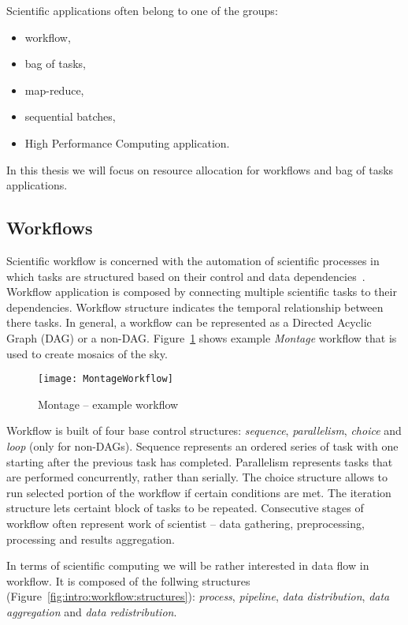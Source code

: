 Scientific applications often belong to one of the groups: 
\begin{itemize}
  \item workflow,
  \item bag of tasks,
  \item map-reduce,  
  \item sequential batches,
  \item High Performance Computing application.
\end{itemize}

In this thesis we will focus on resource allocation for workflows and bag of tasks applications.

\subsection{Workflows}
\label{intro:workflow}

Scientific workflow is concerned with the automation of scientific processes in which tasks are structured based on their control and data dependencies~\cite{Taylor:2006:WES:1196459}. Workflow application is composed by connecting multiple scientific tasks to their dependencies. Workflow structure indicates the temporal relationship between there tasks. In general, a workflow can be represented as a Directed Acyclic Graph (DAG) or a non-DAG. Figure~\ref{fig:intro:workflow} shows example \emph{Montage} workflow that is used to create mosaics of the sky.

\begin{figure}[tb]
   \centering
   \texttt{[image: MontageWorkflow]}  
   \caption{Montage – example workflow~\cite{Bharathi08}}
   \label{fig:intro:workflow}
\end{figure} 


Workflow is built of four base control structures: \emph{sequence}, \emph{parallelism}, \emph{choice} and \emph{loop} (only for non-DAGs). Sequence represents an ordered series of task with one starting after the previous task has completed. Parallelism represents tasks that are performed concurrently, rather than serially. The choice structure allows to run selected portion of the workflow if certain conditions are met. The iteration structure lets certaint block of tasks to be repeated. Consecutive stages of workflow often represent work of scientist – data gathering, preprocessing, processing and results aggregation. 

In terms of scientific computing we will be rather interested in data flow in workflow. It is composed of the follwing structures (Figure~\ref{fig:intro:workflow:structures}): \emph{process}, \emph{pipeline}, \emph{data distribution}, \emph{data aggregation} and \emph{data redistribution}.

